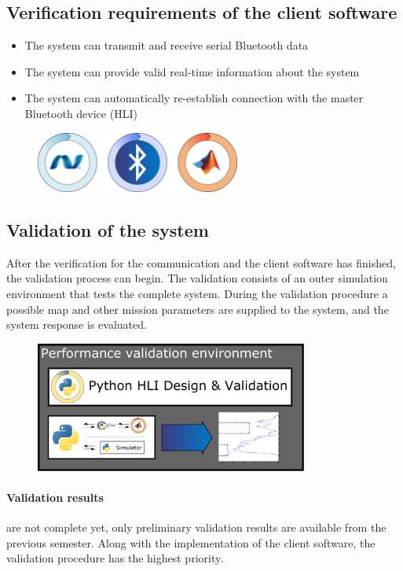 \subsection{Verification requirements of the client software}

\begin{itemize}

\item The system can transmit and receive serial Bluetooth data
\item The system can provide valid real-time information about the system
\item The system can automatically re-establish connection with the master Bluetooth device (HLI)

\end{itemize}

\begin{figure}[H]
	\centering
	\includegraphics[width=0.6\textwidth]{img2/VeriBadges}
	\caption{}
	\label{}
\end{figure}

\subsection{Validation of the system}

After the verification for the communication and the client software has finished, the validation process can begin. The validation consists of an outer simulation environment that tests the complete system. During the validation procedure a possible map and other mission parameters are supplied to the system, and the system response is evaluated.

\begin{figure}[H]
	\centering
	\includegraphics[width=0.8\textwidth]{img2/HLIVali}
	\caption{}
	\label{}
\end{figure}

\paragraph{Validation results} are not complete yet, only preliminary validation results are available from the previous semester. Along with the implementation of the client software, the validation procedure has the highest priority.